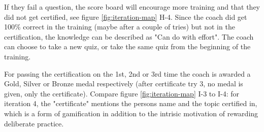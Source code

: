    If they fail a question, the score board will encourage more training and that they did not get certified, see figure \ref{fig:iteration-map} H-4. Since the coach did get 100\% correct in the training (maybe after a couple of tries) but not in the certification, the knowledge can be described as "Can do with effort". The coach can choose to take a new quiz, or take the same quiz from the beginning of the training.

   For passing the certification on the 1st, 2nd or 3rd time the coach is awarded a Gold, Silver or Bronze medal respectively (after certificate try 3, no medal is given, only the certificate). Compare figure \ref{fig:iteration-map} I-3 to I-4: for iteration 4, the "certificate" mentions the persons name and the topic certified in, which is a form of gamification in addition to the intrisic motivation of rewarding deliberate practice.
